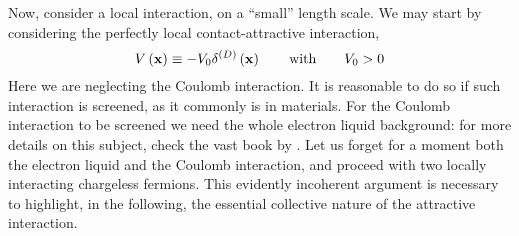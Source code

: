Now, consider a local interaction, on a ``small'' length scale. We may start by considering the perfectly local contact-attractive interaction,
\[
	V \lrR{\mathbf{x}} \equiv - V_0 \delta^{(D)} \lrR{\mathbf{x}}
	\quad\qq{with}\quad
	V_0 > 0
\]
Here we are neglecting the Coulomb interaction. It is reasonable to do so if such interaction is screened, as it commonly is in materials. For the Coulomb interaction to be screened we need the whole electron liquid background: for more details on this subject, check the vast book  \cite{giuliani2008quantum} by \citeauthor{giuliani2008quantum}. Let us forget for a moment both the electron liquid and the Coulomb interaction, and proceed with two locally interacting chargeless fermions. This evidently incoherent argument is necessary to highlight, in the following, the essential collective nature of the attractive interaction.

